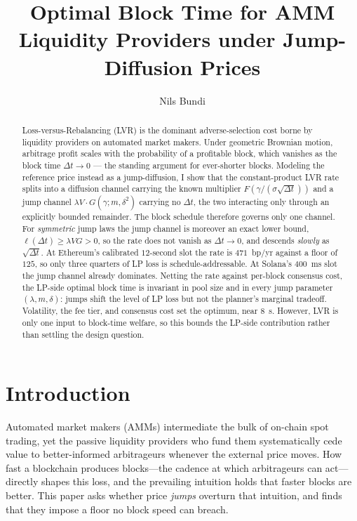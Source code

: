 \documentclass[runningheads]{llncs}
\title{Optimal Block Time for AMM\\ Liquidity Providers under Jump-Diffusion Prices}
\author{Nils Bundi\orcidID{0000-0003-3576-3289}}
\institute{Zurich University of Applied Sciences, School of Engineering,\\
Winterthur, Switzerland\\
\email{bund@zhaw.ch}}
\newcommand{\dt}{\Delta t}
\newcommand{\1}{\mathbf{1}}
\begin{document}
\maketitle

\begin{abstract}
Loss-versus-Rebalancing (LVR) is the dominant adverse-selection cost borne by liquidity providers on automated market makers. Under geometric Brownian motion, arbitrage profit scales with the probability of a profitable block, which vanishes as the block time $\dt \to 0$ --- the standing argument for ever-shorter blocks. Modeling the reference price instead as a jump-diffusion, I show that the constant-product LVR rate splits into a diffusion channel carrying the known multiplier $F(\gamma/(\sigma\sqrt{\dt}))$ and a jump channel $\lambda V \cdot G(\gamma;m,\delta^2)$ carrying no $\dt$, the two interacting only through an explicitly bounded remainder. The block schedule therefore governs only one channel. For \emph{symmetric} jump laws the jump channel is moreover an exact lower bound, $\ell(\dt) \ge \lambda V G > 0$, so the rate does not vanish as $\dt \to 0$, and descends \emph{slowly} as $\sqrt{\dt}$. At Ethereum's calibrated $12$-second slot the rate is $471$~bp/yr against a floor of $125$, so only three quarters of LP loss is schedule-addressable. At Solana's $400$~ms slot the jump channel already dominates. Netting the rate against per-block consensus cost, the LP-side optimal block time is invariant in pool size and in every jump parameter $(\lambda,m,\delta)$: jumps shift the level of LP loss but not the planner's marginal tradeoff. Volatility, the fee tier, and consensus cost set the optimum, near $8$~s. However, LVR is only one input to block-time welfare, so this bounds the LP-side contribution rather than settling the design question.

\end{abstract}

\section{Introduction}\label{sec:intro}

Automated market makers (AMMs) intermediate the bulk of on-chain spot trading, yet the passive liquidity providers who fund them systematically cede value to better-informed arbitrageurs whenever the external price moves. How fast a blockchain produces blocks---the cadence at which arbitrageurs can act---directly shapes this loss, and the prevailing intuition holds that faster blocks are better. This paper asks whether price \emph{jumps} overturn that intuition, and finds that they impose a floor no block speed can breach.
\end{document}
